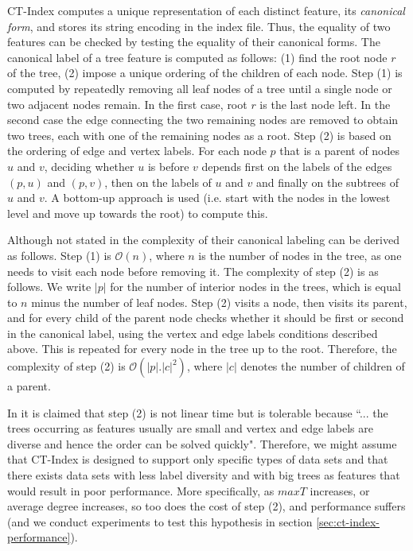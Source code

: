\documentclass{l4proj}
\begin{document}
CT-Index computes a unique representation of each distinct feature, its \emph{canonical form}, and stores its string encoding in the index file. Thus, the equality of two features can be checked by testing the equality of their canonical forms. The canonical label of a tree feature is computed as follows: (1) find the root node $r$ of the tree, (2) impose a unique ordering of the children of each node. Step (1) is computed by repeatedly removing all leaf nodes of a tree until a single node or two adjacent nodes remain. In the first case, root $r$ is the last node left. In the second case the edge connecting the two remaining nodes are removed to obtain two trees, each with one of the remaining nodes as a root. 
Step (2) is based on the ordering of edge and vertex labels. For each node $p$ that is a parent of nodes $u$ and $v$, deciding whether $u$ is before $v$ depends first on the labels of the edges $(p,u)$ and $(p,v)$, then on the labels of $u$ and $v$ and finally on the subtrees of $u$ and $v$. A bottom-up approach is used (i.e. start with the nodes in the lowest level and move up towards the root) to compute this.

Although not stated in \cite{ctindex} the complexity of their canonical labeling can be derived as follows. Step (1) is $\mathcal{O}(n)$, where $n$ is the number of nodes in the tree, as one needs to visit each node before removing it. The complexity of step (2) is as follows. We write $|p|$ for the number of interior nodes in the trees, which is equal to $n$ minus the number of leaf nodes. Step (2) visits a node, then visits its parent, and for every child of the parent node checks whether it should be first or second in the canonical label, using the vertex and edge labels conditions described above. This is repeated for every node in the tree up to the root. Therefore, the complexity of step (2) is $\mathcal{O}(|p|.|c|^{2})$, where $|c|$ denotes the number of children of a parent.

In \cite{ctindex} it is claimed that step (2) is not linear time but is tolerable because ``... the trees occurring as features usually are small and vertex and edge labels are diverse and hence the order can be solved quickly". Therefore, we might assume that CT-Index is designed to support only specific types of data sets and that there exists data sets with less label diversity and with big trees as features that would result in poor performance. More specifically, as $maxT$ increases, or average degree increases, so too does the cost of step (2), and performance suffers (and we conduct experiments to test this hypothesis in section \ref{sec:ct-index-performance}).
\end{document}
